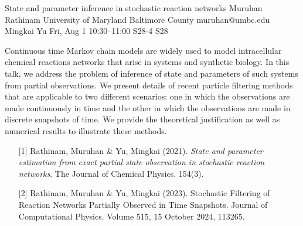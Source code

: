 \begin{talk}
  {State and parameter inference in stochastic reaction networks}%
  {Muruhan Rathinam}%
  {University of Maryland Baltimore County}%
  {muruhan@umbc.edu}%
  {Mingkai Yu}%
  {}%
  {Fri, Aug 1 10:30–11:00}%
  {S28-4}%
  {S28}%
  
				
Continuous time Markov chain models are widely used to model intracellular chemical reactions networks that arise in systems and synthetic biology. In this talk, we address the problem of inference of state and parameters of such systems from partial observations. We present details of recent particle filtering methods that are applicable to two different scenarios: one in which the observations are made continuously in time and the other in which the observations are made in discrete snapshots of time.            We provide the theoretical justification as well as numerical results to illustrate these methods.       
			
\medskip

\begin{enumerate}
	\item[{[1]}] Rathinam, Muruhan \& Yu, Mingkai (2021). {\it State and parameter estimation from exact partial state observation in stochastic reaction networks}. The Journal of Chemical Physics. 
 154(3).
	\item[{[2]}] Rathinam, Muruhan \& Yu, Mingkai (2023). Stochastic Filtering of Reaction Networks Partially Observed in Time Snapshots. Journal of Computational Physics. 
Volume 515, 15 October 2024, 113265. 

\end{enumerate}

\end{talk}

